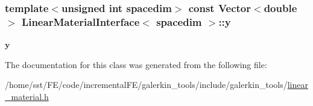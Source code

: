 \subsubsection[{\texorpdfstring{y}{y}}]{\setlength{\rightskip}{0pt plus 5cm}template$<$unsigned int spacedim$>$ const {\bf Vector}$<$double$>$ {\bf Linear\+Material\+Interface}$<$ spacedim $>$\+::y\hspace{0.3cm}{\ttfamily [private]}}\hypertarget{class_linear_material_interface_a3864513d7662e4d1c91e606467befd59}{}\label{class_linear_material_interface_a3864513d7662e4d1c91e606467befd59}
$\boldsymbol{y}$ 

The documentation for this class was generated from the following file\+:\begin{DoxyCompactItemize}
\item 
/home/sst/\+F\+E/code/incremental\+F\+E/galerkin\+\_\+tools/include/galerkin\+\_\+tools/\hyperlink{linear__material_8h}{linear\+\_\+material.\+h}\end{DoxyCompactItemize}
